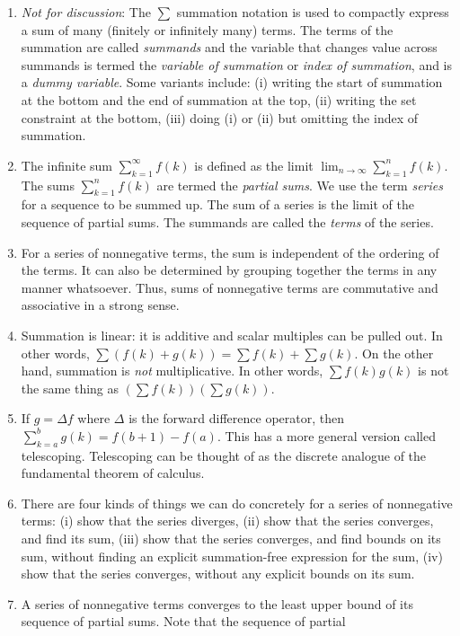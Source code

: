 \documentclass[10pt]{amsart}
\begin{document}
\begin{enumerate}
\item {\em Not for discussion}: The $\sum$ summation notation is used
  to compactly express a sum of many (finitely or infinitely many)
  terms. The terms of the summation are called {\em summands} and the
  variable that changes value across summands is termed the {\em
  variable of summation} or {\em index of summation}, and is a {\em
  dummy variable}. Some variants include: (i) writing the start of
  summation at the bottom and the end of summation at the top, (ii)
  writing the set constraint at the bottom, (iii) doing (i) or (ii)
  but omitting the index of summation.
\item The infinite sum $\sum_{k=1}^\infty f(k)$ is defined as the
  limit $\lim_{n \to \infty} \sum_{k=1}^n f(k)$. The sums
  $\sum_{k=1}^n f(k)$ are termed the {\em partial sums}. We use the
  term {\em series} for a sequence to be summed up. The sum of a
  series is the limit of the sequence of partial sums. The summands
  are called the {\em terms} of the series.
\item For a series of nonnegative terms, the sum is independent of the
  ordering of the terms. It can also be determined by grouping
  together the terms in any manner whatsoever. Thus, sums of
  nonnegative terms are commutative and associative in a strong sense.
\item Summation is linear: it is additive and scalar multiples can be
  pulled out. In other words, $\sum (f(k) + g(k)) = \sum f(k) + \sum
  g(k)$. On the other hand, summation is {\em not} multiplicative. In
  other words, $\sum f(k)g(k)$ is not the same thing as $(\sum
  f(k))(\sum g(k))$.
\item If $g = \Delta f$ where $\Delta$ is the forward difference
  operator, then $\sum_{k=a}^b g(k) = f(b + 1) - f(a)$. This has a
  more general version called telescoping. Telescoping can be thought
  of as the discrete analogue of the fundamental theorem of calculus.
\item There are four kinds of things we can do concretely for a series
  of nonnegative terms: (i) show that the series diverges, (ii) show
  that the series converges, and find its sum, (iii) show that the
  series converges, and find bounds on its sum, without finding an
  explicit summation-free expression for the sum, (iv) show that the
  series converges, without any explicit bounds on its sum.
\item A series of nonnegative terms converges to the least upper bound
  of its sequence of partial sums. Note that the sequence of partial

\end{enumerate}
\end{document}
